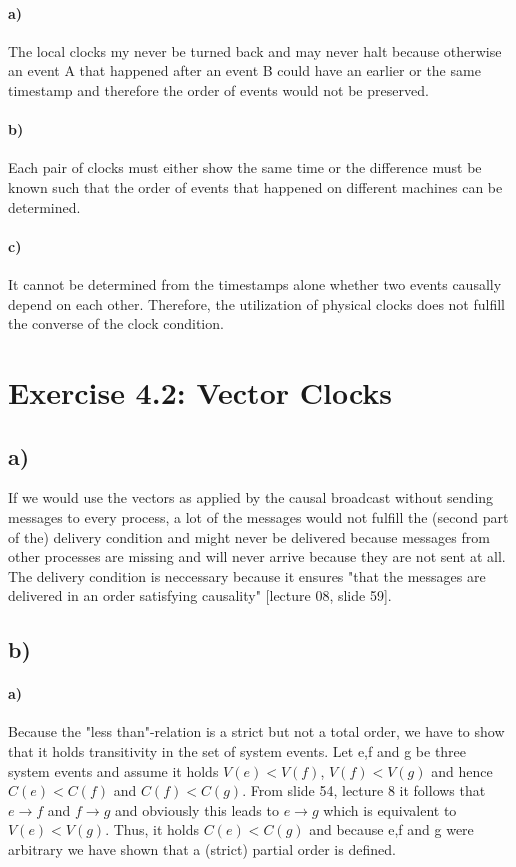 \documentclass[12pt,a4paper]{article}
\begin{document}
    \paragraph{a)} The local clocks my never be turned back and may never halt because otherwise an event A that happened after an event B could have an earlier or the same timestamp and therefore the order of events would not be preserved.
  	\paragraph{b)} Each pair of clocks must either show the same time or the difference must be known such that the order of events that happened on different machines can be determined.
  	\paragraph{c)} It cannot be determined from the timestamps alone whether two events causally depend on each other. Therefore, the utilization of physical clocks does not fulfill the converse of the clock condition.
  	
\section{Exercise 4.2: Vector Clocks}
	\subsection*{a)} %
	If we would use the vectors as applied by the causal broadcast without sending messages to every process, a lot of the messages would not fulfill the (second part of the) delivery condition and might never be delivered because messages from other processes are missing and will never arrive because they are not sent at all. The delivery condition is neccessary because it ensures "that the messages are delivered in an order
	satisfying causality" [lecture 08, slide 59].
	\subsection*{b)} %
		\paragraph{a)} Because the "less than"-relation is a strict but not a total order, we have to show that it holds transitivity in the set of system events. Let e,f and g be three system events and assume it holds $V(e)<V(f)$, $V(f)<V(g)$ and hence $C(e)<C(f)$ and $C(f)<C(g)$. From slide 54, lecture 8 it follows that $e \rightarrow f$ and $f \rightarrow g$ and obviously this leads to $e \rightarrow g$ which is equivalent to $V(e)<V(g)$. Thus, it holds $C(e)<C(g)$ and because e,f and g were arbitrary we have shown that a (strict) partial order is defined.
\end{document}
